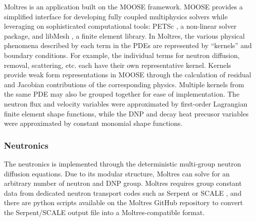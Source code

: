 Moltres is an application built on the MOOSE \cite{gaston_physics-based_2015}
framework. MOOSE provides a simplified interface for developing fully
coupled multiphysics solvers while leveraging on sophisticated computational
tools: PETSc \cite{satish_petsc_2019}, a non-linear solver package, and
libMesh \cite{kirk_libmesh:_2006}, a finite element library. In Moltres, the
various physical phenomena described by each term in the \glspl{PDE} are
represented by ``kernels'' and boundary conditions. For
example, the individual terms for neutron diffusion, removal, scattering, etc.
each have their own representative kernel. Kernels provide weak
form representations in MOOSE through the calculation of residual and Jacobian
contributions of the corresponding physics. Multiple kernels from the same
\gls{PDE} may also be grouped together for ease of implementation. The neutron
flux and velocity variables were approximated by first-order
Lagrangian finite element shape functions, while the \gls{DNP} and decay heat
precusor variables were approximated by constant monomial shape functions.

\subsubsection{Neutronics}

The neutronics is implemented through the deterministic multi-group neutron
diffusion equations. Due to its modular structure, Moltres can solve for an
arbitrary number of neutron and \gls{DNP} group. Moltres requires group
constant data from dedicated neutron transport codes such as Serpent or SCALE
\cite{dehart_reactor_2011}, and there are python scripts available on the
Moltres GitHub repository \cite{lindsay_moltres_2017} to convert the
Serpent/SCALE output file into a Moltres-compatible format.

